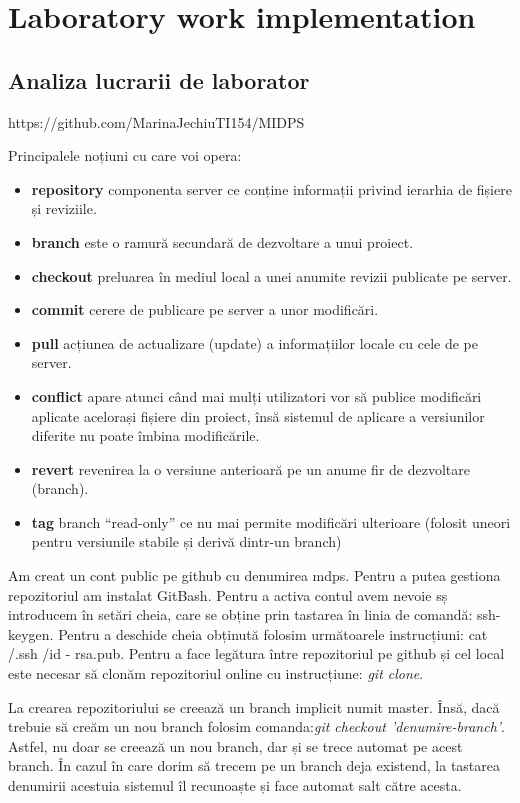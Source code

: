 \section{Laboratory work implementation}

\subsection{Analiza lucrarii de laborator}

https://github.com/MarinaJechiuTI154/MIDPS

	Principalele noțiuni cu care voi opera:
	\begin{itemize}
	\item \textbf{repository}  componenta server ce conține informații privind ierarhia de fișiere și reviziile.
	\item \textbf{branch} este o ramură secundară de dezvoltare a unui proiect.
	\item \textbf{checkout}  preluarea în mediul local a unei anumite revizii publicate pe server.
	\item \textbf{commit} cerere de publicare pe server a unor modificări.
	\item \textbf{pull} acțiunea de actualizare (update) a informațiilor locale cu cele de pe server.
	\item \textbf{conflict} apare atunci când mai mulți utilizatori vor să publice modificări aplicate acelorași fișiere din proiect, însă sistemul de aplicare a versiunilor diferite nu poate îmbina modificările.
	\item \textbf{revert} revenirea la o versiune anterioară pe un anume fir de dezvoltare (branch).
	\item \textbf{tag} branch “read-only” ce nu mai permite modificări ulterioare (folosit uneori pentru versiunile stabile și derivă dintr-un branch)
	\end{itemize}
	
	Am creat un cont public pe github cu denumirea mdps. Pentru a putea gestiona repozitoriul am instalat GitBash. Pentru a activa contul avem nevoie sș introducem în  setări cheia, care se obține prin tastarea în linia de comandă: ssh-keygen. Pentru a deschide cheia obținută folosim următoarele instrucțiuni:  cat ~ /.ssh /id - rsa.pub. Pentru a face legătura între repozitoriul pe github și cel local este necesar să clonăm repozitoriul online cu instrucțiune: \textit{git clone}.
	
	La crearea repozitoriului se creează un branch implicit numit master. Însă, dacă trebuie să creăm un nou branch folosim comanda:\textit{git checkout 'denumire-branch'}. Astfel, nu doar se creează un nou branch, dar și se trece automat pe acest branch. În cazul în care dorim să trecem pe un branch deja existend, la tastarea denumirii acestuia sistemul îl recunoaște și face automat salt către acesta. 
	
